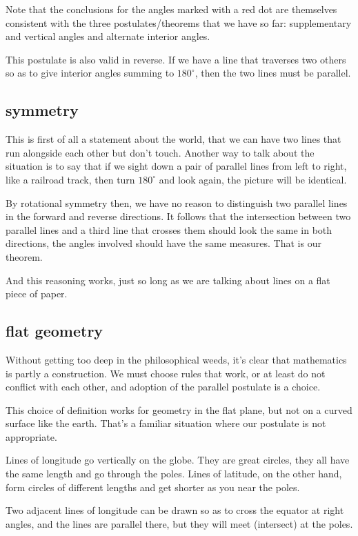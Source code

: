 \documentclass[11pt, oneside]{article}
\begin{document}
Note that the conclusions for the angles marked with a red dot are themselves consistent with the three postulates/theorems that we have so far:  supplementary and vertical angles and alternate interior angles.

This postulate is also valid in reverse.  If we have a line that traverses two others so as to give interior angles summing to $180^{\circ}$, then the two lines must be parallel.

\subsection*{symmetry}

This is first of all a statement about the world, that we can have two lines that run alongside each other but don't touch.  Another way to talk about the situation is to say that if we sight down a pair of parallel lines from left to right, like a railroad track, then turn $180^{\circ}$ and look again, the picture will be identical.

By rotational symmetry then, we have no reason to distinguish two parallel lines in the forward and reverse directions.  It follows that the intersection between two parallel lines and a third line that crosses them should look the same in both directions, the angles involved should have the same measures.  That is our theorem.  

And this reasoning works, just so long as we are talking about lines on a flat piece of paper.

\subsection*{flat geometry}

Without getting too deep in the philosophical weeds, it's clear that mathematics is partly a construction.  We must choose rules that work, or at least do not conflict with each other, and adoption of the parallel postulate is a choice.  

This choice of definition works for geometry in the flat plane, but not on a curved surface like the earth.  That's a familiar situation where our postulate is not appropriate.

Lines of longitude go vertically on the globe.  They are great circles, they all have the same length and go through the poles.  Lines of latitude, on the other hand, form circles of different lengths and get shorter as you near the poles.

Two adjacent lines of longitude can be drawn so as to cross the equator at right angles, and the lines are parallel there, but they will meet (intersect) at the poles.  
\end{document}
